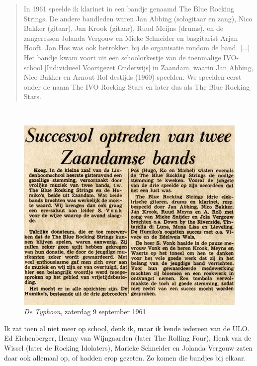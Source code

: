 \documentclass[10pt,twoside, openright]{memoir}
\begin{document}
\begin{quote}
In 1961 speelde ik klarinet in een bandje genaamd The Blue Rocking Strings. De andere bandleden waren Jan Abbing (sologitaar en zang), Nico Bakker (gitaar), Jan Krook (gitaar), Ruud Meijns (drums), en de zangeressen Jolanda Vergouw en Mieke Schneider en basgitarist Arjan Hooft. Jan Hos was ook betrokken bij de organisatie rondom de band. [...] Het bandje kwam voort uit een schoolorkestje van de toenmalige IVO-school [Individueel Voortgezet Onderwijs] in Zaandam, waarin Jan Abbing, Nico Bakker en Arnout Rol destijds (1960) speelden. We speelden eerst onder de naam The IVO Rocking Stars en later dus als The Blue Rocking Stars.
\end{quote}
 
\begin{figure}
\includegraphics[width=\textwidth]{img/ch25/bluerocking}
\caption*{\footnotesize \emph{De Typhoon}, zaterdag 9 september 1961}
\end{figure}

\noindent Ik zat toen al niet meer op school, denk ik, maar ik kende iedereen van de ULO. Ed Eichenberger, Henny van Wijngaarden (later The Rolling Four), Henk van de Wissel (later de Rocking Idolaters), Marieke Schneider en Jolanda Vergouw zaten daar ook allemaal op, of hadden erop gezeten. Zo komen die bandjes bij elkaar.
\end{document}
